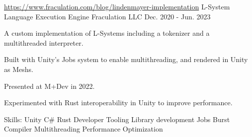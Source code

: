 \begin{cventries}
  \cventry
 {\href{https://www.fraculation.com/blog/lindenmayer-implementation}{https://www.fraculation.com/blog/lindenmayer-implementation}} %
 {L-System Language Execution Engine} %
 {Fraculation LLC} %
 {Dec. 2020 - Jun. 2023} %
 {
      \begin{cvitems} %
        \item {A custom implementation of L-Systems including a tokenizer and a multithreaded interpreter.}
        \item {Built with Unity's Jobs system to enable multithreading, and rendered in Unity as Meshs.}
        \item {Presented at M+Dev in 2022.}
        \item {Experimented with Rust interoperability in Unity to improve performance.}
        \item {Skills: Unity \textbullet{} C\# \textbullet{} Rust \textbullet{} Developer Tooling \textbullet{} Library development  \textbullet{} Jobs \textbullet{} Burst Compiler \textbullet{} Multithreading \textbullet{} Performance Optimization}
      \end{cvitems}
 }

\end{cventries}
    